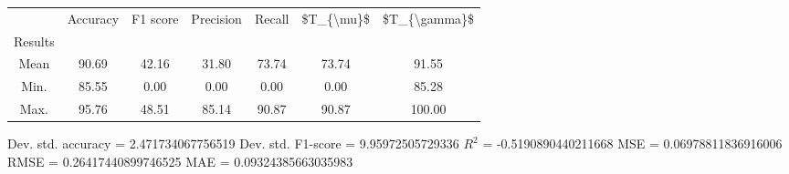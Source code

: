 \begin{tabular}{|c|c|c|c|c|c|c|}
\toprule
{} &  Accuracy &  F1 score &  Precision &  Recall &  \$T\_\{\textbackslash mu\}\$ &  \$T\_\{\textbackslash gamma\}\$ \\
Results &           &           &            &         &            &               \\
\hline
Mean    &     90.69 &     42.16 &      31.80 &   73.74 &      73.74 &         91.55 \\
Min.    &     85.55 &      0.00 &       0.00 &    0.00 &       0.00 &         85.28 \\
Max.    &     95.76 &     48.51 &      85.14 &   90.87 &      90.87 &        100.00 \\
\bottomrule
\end{tabular}

 Dev. std. accuracy = 2.471734067756519
 Dev. std. F1-score = 9.95972505729336
 $R^2$ = -0.5190890440211668
 MSE = 0.06978811836916006
 RMSE = 0.26417440899746525
 MAE = 0.09324385663035983